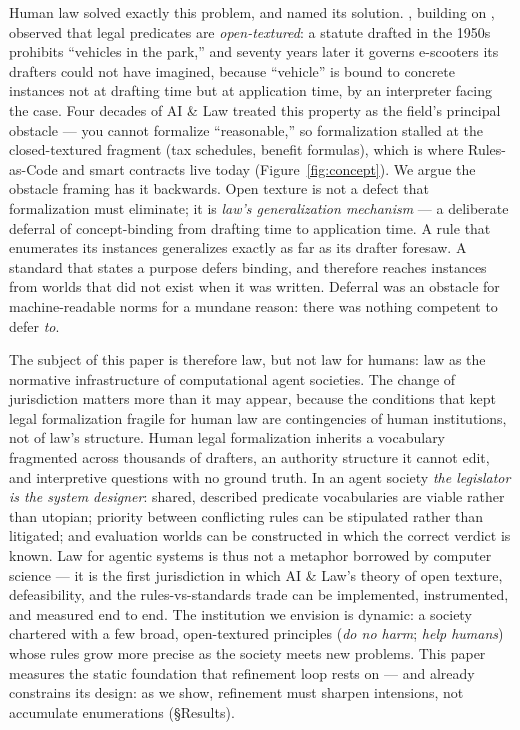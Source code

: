 Human law solved exactly this problem, and named its solution.
\citet{hart1961concept}, building on \citet{waismann1945verifiability},
observed that legal predicates are \emph{open-textured}: a statute drafted in
the 1950s prohibits ``vehicles in the park,'' and seventy years later it
governs e-scooters its drafters could not have imagined, because ``vehicle''
is bound to concrete instances not at drafting time but at application time,
by an interpreter facing the case. Four decades of AI \& Law treated this
property as the field's principal obstacle --- you cannot formalize
``reasonable,'' so formalization stalled at the closed-textured fragment (tax
schedules, benefit formulas), which is where Rules-as-Code and smart contracts
live today (Figure~\ref{fig:concept}). We argue the obstacle framing has it backwards. Open texture is
not a defect that formalization must eliminate; it is \emph{law's
generalization mechanism} --- a deliberate deferral of concept-binding from
drafting time to application time. A rule that enumerates its instances
generalizes exactly as far as its drafter foresaw. A standard that states a
purpose defers binding, and therefore reaches instances from worlds that did
not exist when it was written. Deferral was an obstacle for machine-readable
norms for a mundane reason: there was nothing competent to defer \emph{to}.

The subject of this paper is therefore law, but not law for humans: law as
the normative infrastructure of computational agent societies. The change of
jurisdiction matters more than it may appear, because the conditions that
kept legal formalization fragile for human law are contingencies of human
institutions, not of law's structure. Human legal formalization inherits a
vocabulary fragmented across thousands of drafters, an authority structure it
cannot edit, and interpretive questions with no ground truth. In an agent
society \emph{the legislator is the system designer}: shared, described
predicate vocabularies are viable rather than utopian; priority between
conflicting rules can be stipulated rather than litigated; and evaluation
worlds can be constructed in which the correct verdict is known. Law for
agentic systems is thus not a metaphor borrowed by computer science --- it is
the first jurisdiction in which AI \& Law's theory of open texture,
defeasibility, and the rules-vs-standards trade can be implemented,
instrumented, and measured end to end. The institution we envision is
dynamic: a society chartered with a few broad, open-textured principles
(\emph{do no harm}; \emph{help humans}) whose rules grow more precise as the
society meets new problems. This paper measures the static foundation that
refinement loop rests on --- and already constrains its design: as we show,
refinement must sharpen intensions, not accumulate enumerations
(\S Results).

